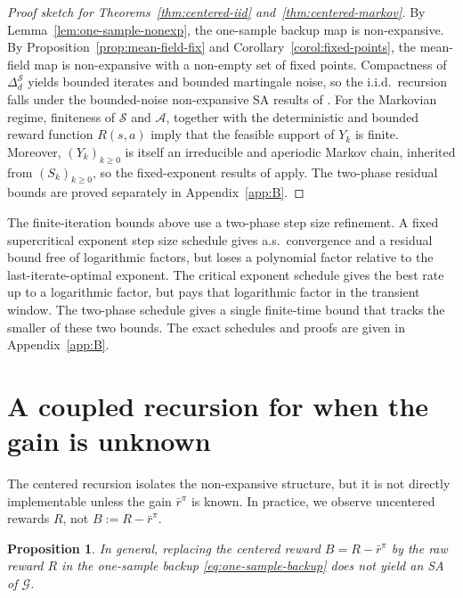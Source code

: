\documentclass{article}
\newtheorem{proposition}[theorem]{Proposition}
\newcommand{\X}{\mathcal{S}}
\newcommand{\A}{\mathcal{A}}
\begin{document}
\begin{proof}[Proof sketch for Theorems~\ref{thm:centered-iid} and~\ref{thm:centered-markov}]
By Lemma~\ref{lem:one-sample-nonexp}, the one-sample backup map is non-expansive. By Proposition~\ref{prop:mean-field-fix} and Corollary~\ref{corol:fixed-points}, the mean-field map is non-expansive with a non-empty set of fixed points. Compactness of $\Delta^\X_d$ yields bounded iterates and bounded martingale noise, so the i.i.d.\ recursion falls under the bounded-noise non-expansive SA results of \citet{bravo2024stochastic}. For the Markovian regime, finiteness of $\X$ and $\A$, together with the deterministic and bounded reward function $R(s, a)$ imply that the feasible support of $Y_k$ is finite. Moreover, $(Y_k)_{k\ge0}$ is itself an irreducible and aperiodic Markov chain, inherited from $(S_k)_{k \ge 0}$, so the fixed-exponent results of \citet{blaser2026asymptotic} apply. The two-phase residual bounds are proved separately in Appendix~\ref{app:B}.
\end{proof}

The finite-iteration bounds above use a two-phase step size refinement. A fixed supercritical exponent step size schedule gives a.s.\ convergence and a residual bound free of logarithmic factors, but loses a polynomial factor relative to the last-iterate-optimal exponent. The critical exponent schedule gives the best rate up to a logarithmic factor, but pays that logarithmic factor in the transient window. The two-phase schedule gives a single finite-time bound that tracks the smaller of these two bounds. The exact schedules and proofs are given in Appendix~\ref{app:B}.

\section{A coupled recursion for when the gain is unknown}\label{sec:uncentered}

The centered recursion isolates the non-expansive structure, but it is not directly implementable unless the gain $\bar r^\pi$ is known. In practice, we observe uncentered rewards $R$, not $B:= R - \bar r^\pi$. 

\begin{proposition}\label{prop:counterexample}
In general, replacing the centered reward $B = R - \bar r^\pi$ by the raw reward $R$ in the one-sample backup \eqref{eq:one-sample-backup} does not yield an SA of $\mathcal G$. 
\end{proposition}
\end{document}
